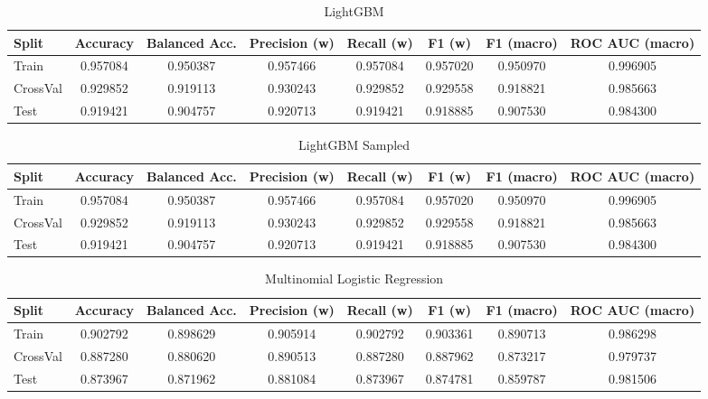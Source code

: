 \begin{table}[H]
	\centering
	\caption{LightGBM}
	\begin{adjustbox}{max width=\textwidth}
		\begin{tabular}{lccccccc}
			\toprule
			Split & Accuracy & Balanced Acc. & Precision (w) & Recall (w) & F1 (w) & F1 (macro) & ROC AUC (macro) \\
			\midrule
			Train & 0.957084 & 0.950387 & 0.957466 & 0.957084 & 0.957020 & 0.950970 & 0.996905 \\
			CrossVal & 0.929852 & 0.919113 & 0.930243 & 0.929852 & 0.929558 & 0.918821 & 0.985663 \\
			Test & 0.919421 & 0.904757 & 0.920713 & 0.919421 & 0.918885 & 0.907530 & 0.984300 \\
			\bottomrule
		\end{tabular}
	\end{adjustbox}
\end{table}

\begin{table}[H]
	\centering
	\caption{LightGBM Sampled}
	\begin{adjustbox}{max width=\textwidth}
		\begin{tabular}{lccccccc}
			\toprule
			Split & Accuracy & Balanced Acc. & Precision (w) & Recall (w) & F1 (w) & F1 (macro) & ROC AUC (macro) \\
			\midrule
			Train & 0.957084 & 0.950387 & 0.957466 & 0.957084 & 0.957020 & 0.950970 & 0.996905 \\
			CrossVal & 0.929852 & 0.919113 & 0.930243 & 0.929852 & 0.929558 & 0.918821 & 0.985663 \\
			Test & 0.919421 & 0.904757 & 0.920713 & 0.919421 & 0.918885 & 0.907530 & 0.984300 \\
			\bottomrule
		\end{tabular}
	\end{adjustbox}
\end{table}

\begin{table}[H]
	\centering
	\caption{Multinomial Logistic Regression}
	\begin{adjustbox}{max width=\textwidth}
		\begin{tabular}{lccccccc}
			\toprule
			Split & Accuracy & Balanced Acc. & Precision (w) & Recall (w) & F1 (w) & F1 (macro) & ROC AUC (macro) \\
			\midrule
			Train & 0.902792 & 0.898629 & 0.905914 & 0.902792 & 0.903361 & 0.890713 & 0.986298 \\
			CrossVal & 0.887280 & 0.880620 & 0.890513 & 0.887280 & 0.887962 & 0.873217 & 0.979737 \\
			Test & 0.873967 & 0.871962 & 0.881084 & 0.873967 & 0.874781 & 0.859787 & 0.981506 \\
			\bottomrule
		\end{tabular}
	\end{adjustbox}
\end{table}

